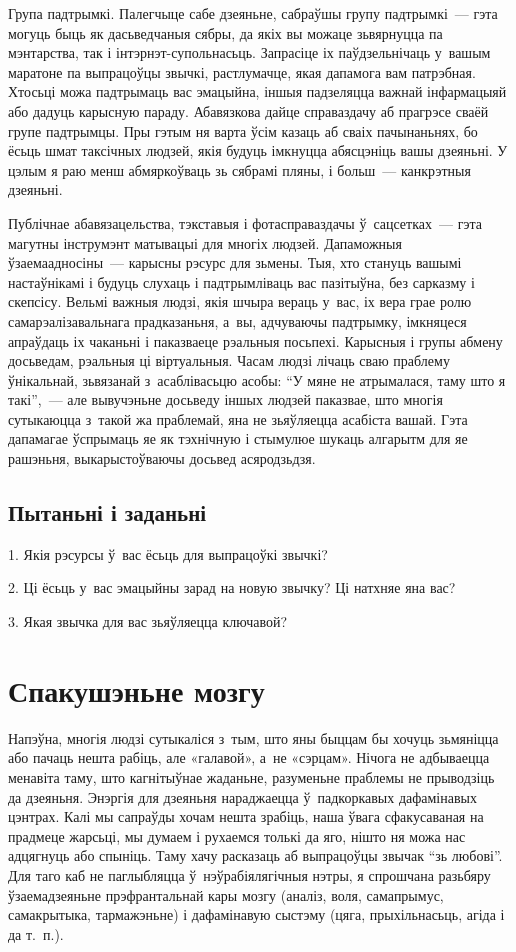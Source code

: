 Група падтрымкі. Палегчыце сабе дзеяньне, сабраўшы групу падтрымкі~--- гэта могуць быць як дасьведчаныя сябры, да якіх вы можаце зьвярнуцца па мэнтарства, так і інтэрнэт-супольнасьць. Запрасіце іх паўдзельнічаць у~вашым маратоне па выпрацоўцы звычкі, растлумачце, якая дапамога вам патрэбная. Хтосьці можа падтрымаць вас эмацыйна, іншыя падзеляцца важнай інфармацыяй або дадуць карысную параду. Абавязкова дайце справаздачу аб прагрэсе сваёй групе падтрымцы. Пры гэтым ня варта ўсім казаць аб сваіх пачынаньнях, бо ёсьць шмат таксічных людзей, якія будуць імкнуцца абясцэніць вашы дзеяньні. У цэлым я раю менш абмяркоўваць зь сябрамі пляны, і больш~--- канкрэтныя дзеяньні. 

Публічнае абавязацельства, тэкставыя і фотасправаздачы ў~сацсетках~--- гэта магутны інструмэнт матывацыі для многіх людзей. Дапаможныя ўзаемаадносіны~--- карысны рэсурс для зьмены. Тыя, хто стануць вашымі настаўнікамі і будуць слухаць і падтрымліваць вас пазітыўна, без сарказму і скепсісу. Вельмі важныя людзі, якія шчыра вераць у~вас, іх вера грае ролю самарэалізавальнага прадказаньня, а~вы, адчуваючы падтрымку, імкняцеся апраўдаць іх чаканьні і паказваеце рэальныя посьпехі. Карысныя і групы абмену досьведам, рэальныя ці віртуальныя. Часам людзі лічаць сваю праблему ўнікальнай, зьвязанай з~асаблівасьцю асобы: ``У мяне не атрымалася, таму што я такі'',~--- але вывучэньне досьведу іншых людзей паказвае, што многія сутыкаюцца з~такой жа праблемай, яна не зьяўляецца асабіста вашай. Гэта дапамагае ўспрымаць яе як тэхнічную і стымулюе шукаць алгарытм для яе рашэньня, выкарыстоўваючы досьвед асяродзьдзя.

\subsection*{Пытаньні і заданьні}

1. Якія рэсурсы ў~вас ёсьць для выпрацоўкі звычкі?

2. Ці ёсьць у~вас эмацыйны зарад на новую звычку? Ці натхняе яна вас?

3. Якая звычка для вас зьяўляецца ключавой?


\section{Спакушэньне мозгу}

Напэўна, многія людзі сутыкаліся з~тым, што яны быццам бы хочуць зьмяніцца або пачаць нешта рабіць, але «галавой», а~не «сэрцам». Нічога не адбываецца менавіта таму, што кагнітыўнае жаданьне, разуменьне праблемы не прыводзіць да дзеяньня. Энэргія для дзеяньня нараджаецца ў~падкоркавых дафамінавых цэнтрах. Калі мы сапраўды хочам нешта зрабіць, наша ўвага сфакусаваная на прадмеце жарсьці, мы думаем і рухаемся толькі да яго, нішто ня можа нас адцягнуць або спыніць. Таму хачу расказаць аб выпрацоўцы звычак ``зь любові''. Для таго каб не паглыбляцца ў~нэўрабіялягічныя нэтры, я спрошчана разьбяру ўзаемадзеяньне прэфрантальнай кары мозгу (аналіз, воля, самапрымус, самакрытыка, тармажэньне) і дафамінавую сыстэму (цяга, прыхільнасьць, агіда і да т.~п.).

